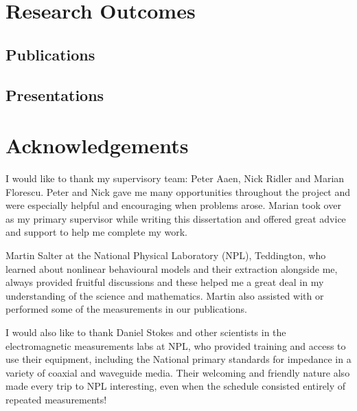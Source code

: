 \documentclass[../thesis/thesis.tex]{subfiles}
\begin{document}
\chapter*{Research Outcomes}
\begin{refsection}
\section*{Publications}
\nocite{Votsi_2020, Salter_2018, Stant_2018_TMTT, Stant_2017, Stant_2016, Stant_2016_Coll}
\printbibliography[heading=none]
\end{refsection}
\begin{refsection}
\section*{Presentations}
\nocite{Stant_2017_pgi, Stant_2017_feps, Stant_2016_pg, Stant_2016_Coll2}
\printbibliography[heading=none]
\end{refsection}
\chapter*{Acknowledgements}
I would like to thank my supervisory team: Peter Aaen, Nick Ridler and Marian Florescu. Peter and Nick gave me many opportunities throughout the project and were especially helpful and encouraging when problems arose. Marian took over as my primary supervisor while writing this dissertation and offered great advice and support to help me complete my work.

Martin Salter at the National Physical Laboratory (NPL), Teddington, who learned about nonlinear behavioural models and their extraction alongside me, always provided fruitful discussions and these helped me a great deal in my understanding of the science and mathematics. Martin also assisted with or performed some of the measurements in our publications.

I would also like to thank Daniel Stokes and other scientists in the electromagnetic measurements labs at NPL, who provided training and access to use their equipment, including the National primary standards for impedance in a variety of coaxial and waveguide media. Their welcoming and friendly nature also made every trip to NPL interesting, even when the schedule consisted entirely of repeated measurements!
\end{document}
